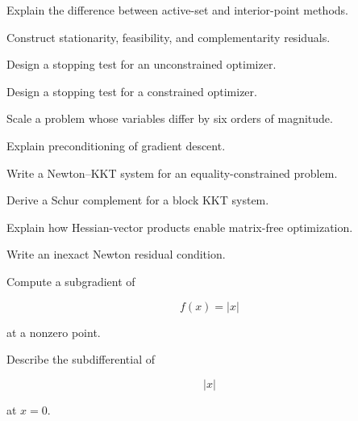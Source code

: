 \begin{exercise}[3]
Explain the difference between active-set and interior-point methods.
\end{exercise}

\begin{exercise}[3]
Construct stationarity, feasibility, and complementarity residuals.
\end{exercise}

\begin{exercise}[3]
Design a stopping test for an unconstrained optimizer.
\end{exercise}

\begin{exercise}[3]
Design a stopping test for a constrained optimizer.
\end{exercise}

\begin{exercise}[3]
Scale a problem whose variables differ by six orders of magnitude.
\end{exercise}

\begin{exercise}[3]
Explain preconditioning of gradient descent.
\end{exercise}

\begin{exercise}[3]
Write a Newton--KKT system for an equality-constrained problem.
\end{exercise}

\begin{exercise}[3]
Derive a Schur complement for a block KKT system.
\end{exercise}

\begin{exercise}[3]
Explain how Hessian-vector products enable matrix-free optimization.
\end{exercise}

\begin{exercise}[3]
Write an inexact Newton residual condition.
\end{exercise}

\begin{exercise}[2]
Compute a subgradient of

\[
f(x)=|x|
\]

at a nonzero point.
\end{exercise}

\begin{exercise}[3]
Describe the subdifferential of

\[
|x|
\]

at \(x=0\).
\end{exercise}

